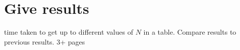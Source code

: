 \section{Give results}
time taken to get up to different values of $N$ in a table. Compare results to previous results. 3+ pages
